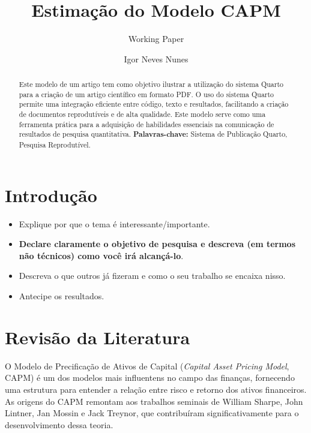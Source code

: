 \documentclass[
  12pt,
  a4paperpaper,
]{article}
\title{Estimação do Modelo CAPM}
\subtitle{Working Paper}
\author{Igor Neves Nunes}
\date{}
\begin{document}
\maketitle
\begin{abstract}
Este modelo de um artigo tem como objetivo ilustrar a utilização do
sistema Quarto para a criação de um artigo científico em formato PDF. O
uso do sistema Quarto permite uma integração eficiente entre código,
texto e resultados, facilitando a criação de documentos reprodutíveis e
de alta qualidade. Este modelo serve como uma ferramenta prática para a
adquisição de habilidades essenciais na comunicação de resultados de
pesquisa quantitativa. \linebreak \textbf{Palavras-chave:} Sistema de
Publicação Quarto, Pesquisa Reprodutível.
\end{abstract}


\section{Introdução}\label{sec-intro}

\begin{itemize}
\item
  Explique por que o tema é interessante/importante.
\item
  \textbf{Declare claramente o objetivo de pesquisa e descreva (em
  termos não técnicos) como você irá alcançá-lo}.
\item
  Descreva o que outros já fizeram e como o seu trabalho se encaixa
  nisso.
\item
  Antecipe os resultados.
\end{itemize}

\section{Revisão da Literatura}\label{sec-revlit}

O Modelo de Precificação de Ativos de Capital (\emph{Capital Asset
Pricing Model}, CAPM) é um dos modelos mais influentens no campo das
finanças, fornecendo uma estrutura para entender a relação entre risco e
retorno dos ativos financeiros. As origens do CAPM remontam aos
trabalhos seminais de William Sharpe, John Lintner, Jan Mossin e Jack
Treynor, que contribuíram significativamente para o desenvolvimento
dessa teoria.
\end{document}
